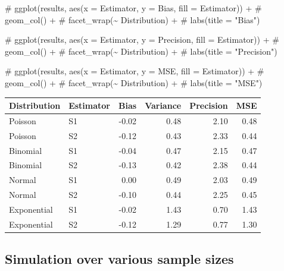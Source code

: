 \documentclass[
]{article}
\newenvironment{Shaded}{\begin{snugshade}}{\end{snugshade}}
\newcommand{\CommentTok}[1]{\textcolor[rgb]{0.37,0.37,0.37}{#1}}
\begin{document}
\normalsize

\normalsize

\begin{Shaded}
\begin{Highlighting}[numbers=left,,]
\CommentTok{\# ggplot(results, aes(x = Estimator, y = Bias, fill = Estimator)) +}
\CommentTok{\#   geom\_col() +}
\CommentTok{\#   facet\_wrap(\textasciitilde{} Distribution) +}
\CommentTok{\#   labs(title = "Bias")}

\CommentTok{\# ggplot(results, aes(x = Estimator, y = Precision, fill = Estimator)) +}
\CommentTok{\#   geom\_col() +}
\CommentTok{\#   facet\_wrap(\textasciitilde{} Distribution) +}
\CommentTok{\#   labs(title = "Precision")}

\CommentTok{\# ggplot(results, aes(x = Estimator, y = MSE, fill = Estimator)) +}
\CommentTok{\#   geom\_col() +}
\CommentTok{\#   facet\_wrap(\textasciitilde{} Distribution) +}
\CommentTok{\#   labs(title = "MSE")}
\end{Highlighting}
\end{Shaded}

\normalsize

\normalsize

\begin{longtable}[]{@{}llrrrr@{}}
\toprule\noalign{}
Distribution & Estimator & Bias & Variance & Precision & MSE \\
\midrule\noalign{}
\endhead
\bottomrule\noalign{}
\endlastfoot
Poisson & S1 & -0.02 & 0.48 & 2.10 & 0.48 \\
Poisson & S2 & -0.12 & 0.43 & 2.33 & 0.44 \\
Binomial & S1 & -0.04 & 0.47 & 2.15 & 0.47 \\
Binomial & S2 & -0.13 & 0.42 & 2.38 & 0.44 \\
Normal & S1 & 0.00 & 0.49 & 2.03 & 0.49 \\
Normal & S2 & -0.10 & 0.44 & 2.25 & 0.45 \\
Exponential & S1 & -0.02 & 1.43 & 0.70 & 1.43 \\
Exponential & S2 & -0.12 & 1.29 & 0.77 & 1.30 \\
\end{longtable}

\normalsize

\subsection{Simulation over various sample
sizes}\label{simulation-over-various-sample-sizes}
\end{document}
